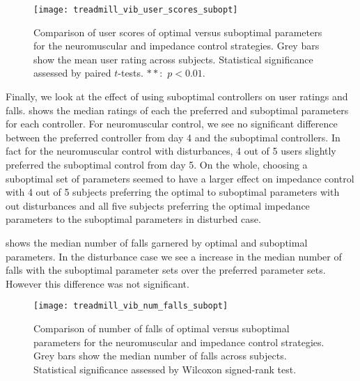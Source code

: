 \begin{figure}[b]
    \centering 
    \texttt{[image: treadmill\_vib\_user\_scores\_subopt]}
    \caption{Comparison of user scores of optimal versus suboptimal parameters
    for the neuromuscular and impedance control strategies. Grey bars show the
    mean user rating across subjects. Statistical significance assessed by
    paired $t$-tests. $**$:~$p <
    0.01$.}\label{fig:treadmill_exp_user_ratings_subopt}
\end{figure}
Finally, we look at the effect of using suboptimal controllers on user ratings
and falls.  shows the median ratings of
each the preferred and suboptimal parameters for each controller. For
neuromuscular control, we see no significant difference between the preferred
controller from day 4 and the suboptimal controllers. In fact for the
neuromuscular control with disturbances, 4 out of 5 users slightly preferred the
suboptimal control from day 5. On the whole, choosing a suboptimal set of
parameters seemed to have a larger effect on impedance control with 4 out of 5
subjects preferring the optimal to suboptimal parameters with out disturbances
and all five subjects preferring the optimal impedance parameters to the
suboptimal parameters in disturbed case.

 shows the median number of falls
garnered by optimal and suboptimal parameters. In the disturbance case we see a
increase in the median number of falls with the suboptimal parameter sets over
the preferred parameter sets. However this difference was not significant.

\begin{figure}[t]
    \centering 
    \texttt{[image: treadmill\_vib\_num\_falls\_subopt]}
    \caption{Comparison of number of falls of optimal versus suboptimal
    parameters for the neuromuscular and impedance control strategies. Grey bars
    show the median number of falls across subjects. Statistical significance
    assessed by Wilcoxon signed-rank
    test.}\label{fig:treadmill_exp_num_falls_subopt}
\end{figure}
